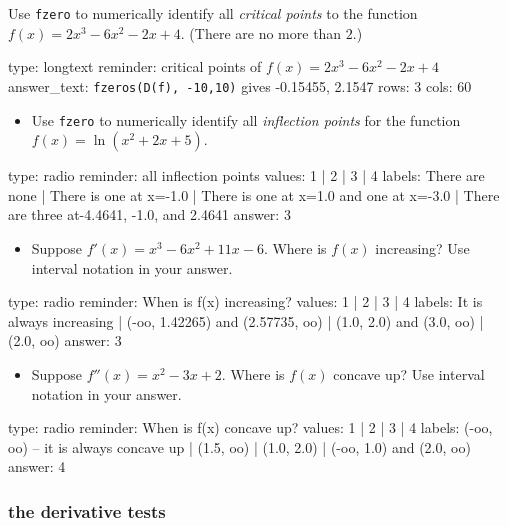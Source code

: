 \documentclass[12pt]{article}
\begin{document}
Use \texttt{fzero} to numerically identify all \emph{critical points} to
the function $f(x) = 2x^3 - 6x^2 - 2x + 4$. (There are no more than
$2$.)

\begin{answer}
type: longtext
reminder: critical points of \( f(x) = 2x^3 - 6x^2 - 2x + 4 \)
answer_text: \verb+fzeros(D(f), -10,10)+ gives -0.15455, 2.1547 
rows: 3
cols: 60
\end{answer}

\begin{itemize}
\itemsep1pt\parskip0pt
\item
  Use \texttt{fzero} to numerically identify all \emph{inflection
  points} for the function $f(x) = \ln(x^2 + 2x + 5)$.
\end{itemize}

\begin{answer}
type: radio
reminder: all inflection points
values: 1 | 2 | 3 | 4
labels: There are none | There is one at x=-1.0 | There is one at x=1.0 and one at x=-3.0 | There are three at-4.4641, -1.0, and 2.4641
answer: 3
\end{answer}

\begin{itemize}
\itemsep1pt\parskip0pt
\item
  Suppose $f'(x) = x^3 - 6x^2 + 11x - 6$. Where is $f(x)$ increasing?
  Use interval notation in your answer.
\end{itemize}

\begin{answer}
type: radio
reminder: When is f(x) increasing?
values: 1 | 2 | 3 | 4
labels: It is always increasing | (-oo, 1.42265) and (2.57735, oo) | (1.0, 2.0) and (3.0, oo) | (2.0, oo)
answer: 3
\end{answer}

\begin{itemize}
\itemsep1pt\parskip0pt
\item
  Suppose $f''(x) = x^2 - 3x + 2$. Where is $f(x)$ concave up? Use
  interval notation in your answer.
\end{itemize}

\begin{answer}
type: radio
reminder: When is f(x) concave up?
values: 1 | 2 | 3 | 4
labels: (-oo, oo) -- it is always concave up | (1.5, oo) | (1.0, 2.0) | (-oo, 1.0) and (2.0, oo)
answer: 4
\end{answer}

\subsubsection{the derivative tests}
\end{document}
